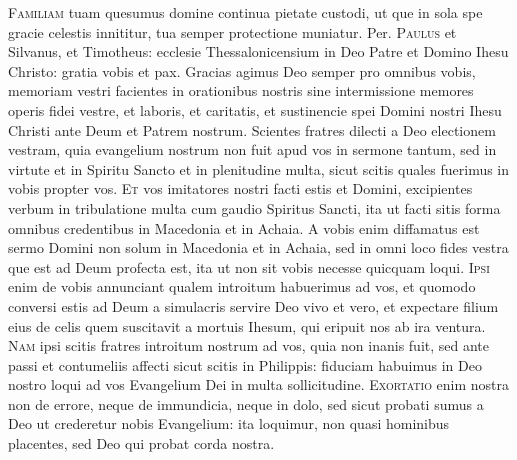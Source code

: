 \begin{multicols*}{2}
{\color{Red} }
\par {}
\lettrine[lines=2]{\zallmancaps \color{Blue} F}{amiliam} \hypertarget{familiam-tuam-dominica-quarta-post-octavas-epyphanie}{tuam} quesumus domine continua pietate custodi, ut que in sola spe gracie celestis innititur, tua semper protectione muniatur. Per.
\lettrine[lines=2]{\zallmancaps \color{Red} P}{aulus} et Silvanus, et Timotheus: ecclesie Thessalonicensium in Deo Patre et Domino Ihesu Christo: gratia vobis et pax. Gracias agimus Deo semper pro omnibus vobis, memoriam vestri facientes in orationibus nostris sine intermissione memores operis fidei vestre, et laboris, et caritatis, et sustinencie spei Domini nostri Ihesu Christi ante Deum et Patrem nostrum. Scientes fratres dilecti a Deo electionem vestram, quia evangelium nostrum non fuit apud vos in sermone tantum, sed in virtute et in Spiritu Sancto et in plenitudine multa, sicut scitis quales fuerimus in vobis propter vos.
\lettrine[lines=2]{\zallmancaps \color{Blue} E}{t} vos imitatores nostri facti estis et Domini, excipientes verbum in tribulatione multa cum gaudio Spiritus Sancti, ita ut facti sitis forma omnibus credentibus in Macedonia et in Achaia. A vobis enim diffamatus est sermo Domini non solum in Macedonia et in Achaia, sed in omni loco fides vestra que est ad Deum profecta est, ita ut non sit vobis necesse quicquam loqui.
\lettrine[lines=2]{\zallmancaps \color{Red} I}{psi} enim de vobis annunciant qualem introitum habuerimus ad vos, et quomodo conversi estis ad Deum a simulacris servire Deo vivo et vero, et expectare filium eius de celis quem suscitavit a mortuis Ihesum, qui eripuit nos ab ira ventura.
\lettrine[lines=2]{\zallmancaps \color{Blue} N}{am} ipsi scitis fratres introitum nostrum ad vos, quia non inanis fuit, sed ante passi et contumeliis affecti sicut scitis in Philippis: fiduciam habuimus in Deo nostro loqui ad vos Evangelium Dei in multa sollicitudine.
\lettrine[lines=2]{\zallmancaps \color{Red} E}{xortatio} enim nostra non de errore, neque de immundicia, neque in dolo, sed sicut probati sumus a Deo ut crederetur nobis Evangelium: ita loquimur, non quasi hominibus placentes, sed Deo qui probat corda nostra.

\end{multicols*}
